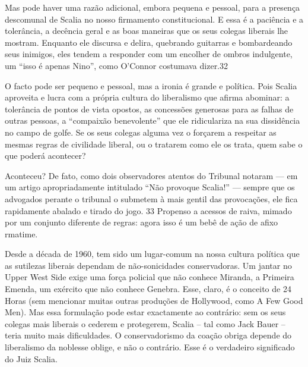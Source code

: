  \par 
Mas pode haver uma razão adicional, embora pequena e pessoal, para a presença descomunal de Scalia no nosso firmamento constitucional. E essa é a paciência e a tolerância, a decência geral e as boas maneiras que os seus colegas liberais lhe mostram. Enquanto ele discursa e delira, quebrando guitarras e bombardeando seus inimigos, eles tendem a responder com um encolher de ombros indulgente, um “isso é apenas Nino”, como O’Connor costumava dizer.{\color{blue}32}
 \par 
O facto pode ser pequeno e pessoal, mas a ironia é grande e política. Pois Scalia aproveita e lucra com a própria cultura do liberalismo que afirma abominar: a tolerância de pontos de vista opostos, as concessões generosas para as falhas de outras pessoas, a “compaixão benevolente” que ele ridiculariza na sua dissidência no campo de golfe. Se os seus colegas alguma vez o forçarem a respeitar as mesmas regras de civilidade liberal, ou o tratarem como ele os trata, quem sabe o que poderá acontecer?
 \par 
Aconteceu? De fato, como dois observadores atentos do Tribunal notaram — em um artigo apropriadamente intitulado “Não provoque Scalia!” — sempre que os advogados perante o tribunal o submetem à mais gentil das provocações, ele fica rapidamente abalado e tirado do jogo. {\color{blue}33} Propenso a acessos de raiva, mimado por um conjunto diferente de regras: agora isso é um bebê de ação de afixo rmatime.
 \par 
Desde a década de 1960, tem sido um lugar-comum na nossa cultura política que as sutilezas liberais dependam de não-sonicidades conservadoras. Um jantar no Upper West Side exige uma força policial que não conhece Miranda, a Primeira Emenda, um exército que não conhece Genebra. Esse, claro, é o conceito de {\color{blue}24} Horas (sem mencionar muitas outras produções de Hollywood, como A Few Good Men). Mas essa formulação pode estar exactamente ao contrário: sem os seus colegas mais liberais o cederem e protegerem, Scalia – tal como Jack Bauer – teria muito mais dificuldades. O conservadorismo da coação obriga depende do liberalismo da noblesse oblige, e não o contrário. Esse é o verdadeiro significado do Juiz Scalia.